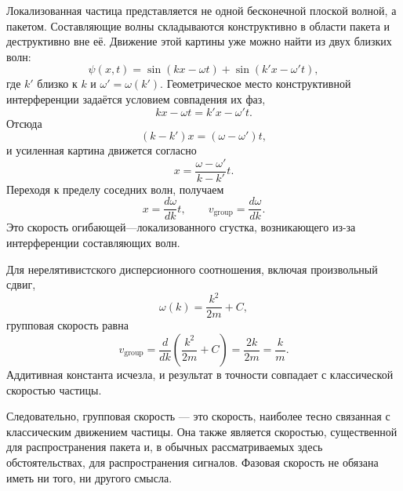 Локализованная частица представляется не одной бесконечной плоской волной, а пакетом. Составляющие волны складываются конструктивно в области пакета и деструктивно вне её. Движение этой картины уже можно найти из двух близких волн:
\begin{equation}
\psi(x,t)=
\sin(kx-\omega t)+
\sin(k'x-\omega't),
\end{equation}
где \(k'\) близко к \(k\) и \(\omega'=\omega(k')\). Геометрическое место конструктивной интерференции задаётся условием совпадения их фаз,
\begin{equation}
kx-\omega t=k'x-\omega't.
\end{equation}
Отсюда
\begin{equation}
(k-k')x=(\omega-\omega')t,
\end{equation}
и усиленная картина движется согласно
\begin{equation}
x=\frac{\omega-\omega'}{k-k'}t.
\end{equation}
Переходя к пределу соседних волн, получаем
\begin{equation}
x=\frac{d\omega}{dk}t,
\qquad
v_{\mathrm{group}}=\frac{d\omega}{dk}.
\end{equation}
Это скорость огибающей---локализованного сгустка, возникающего из-за интерференции составляющих волн.

Для нерелятивистского дисперсионного соотношения, включая произвольный сдвиг,
\begin{equation}
\omega(k)=\frac{k^2}{2m}+C,
\end{equation}
групповая скорость равна
\begin{equation}
v_{\mathrm{group}}
=\frac{d}{dk}\left(\frac{k^2}{2m}+C\right)
=\frac{2k}{2m}
=\frac{k}{m}.
\end{equation}
Аддитивная константа исчезла, и результат в точности совпадает с классической скоростью частицы.

\begin{classroomqa}
\end{classroomqa}

Следовательно, групповая скорость — это скорость, наиболее тесно связанная с классическим движением частицы. Она также является скоростью, существенной для распространения пакета и, в обычных рассматриваемых здесь обстоятельствах, для распространения сигналов. Фазовая скорость не обязана иметь ни того, ни другого смысла.

